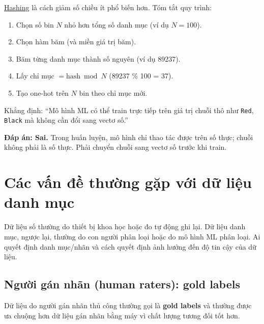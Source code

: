 \documentclass[12pt,a4paper]{article}
\begin{document}
\begin{dinhnghia}[title={Hashing (hashing trick)}]
\href{https://developers.google.com/machine-learning/glossary\#hashing}{Hashing} là cách giảm số chiều ít phổ biến hơn. Tóm tắt quy trình:
\begin{enumerate}
  \item Chọn số bin \(N\) nhỏ hơn tổng số danh mục (ví dụ \(N=100\)).
  \item Chọn hàm băm (và miền giá trị băm).
  \item Băm từng danh mục thành số nguyên (ví dụ 89237).
  \item Lấy chỉ mục \(= \text{hash} \bmod N\) (89237 \% 100 = 37).
  \item Tạo one-hot trên \(N\) bin theo chỉ mục mới.
\end{enumerate}
\end{dinhnghia}

\begin{luuy}[title={Bài tập: mô hình có thể train trực tiếp trên chuỗi?}]
Khẳng định: ``Mô hình ML có thể train trực tiếp trên giá trị chuỗi thô như \texttt{Red}, \texttt{Black} mà không cần đổi sang vectơ số.''

\textbf{Đáp án: Sai.} Trong huấn luyện, mô hình chỉ thao tác được trên số thực; chuỗi không phải là số thực. Phải chuyển chuỗi sang vectơ số trước khi train.
\end{luuy}

\section{Các vấn đề thường gặp với dữ liệu danh mục}

\begin{ynghia}
Dữ liệu số thường do thiết bị khoa học hoặc đo tự động ghi lại. Dữ liệu danh mục, ngược lại, thường do con người phân loại hoặc do mô hình ML phân loại. Ai quyết định danh mục/nhãn và cách quyết định ảnh hưởng đến độ tin cậy của dữ liệu.
\end{ynghia}

\subsection{Người gán nhãn (human raters): gold labels}

\begin{dinhnghia}[title={Gold labels}]
Dữ liệu do người gán nhãn thủ công thường gọi là \textbf{gold labels} và thường được ưa chuộng hơn dữ liệu gán nhãn bằng máy vì chất lượng tương đối tốt hơn.
\end{dinhnghia}
\end{document}
